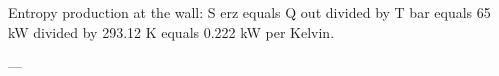 Entropy production at the wall:  
S erz equals Q out divided by T bar equals 65 kW divided by 293.12 K equals 0.222 kW per Kelvin.  

---